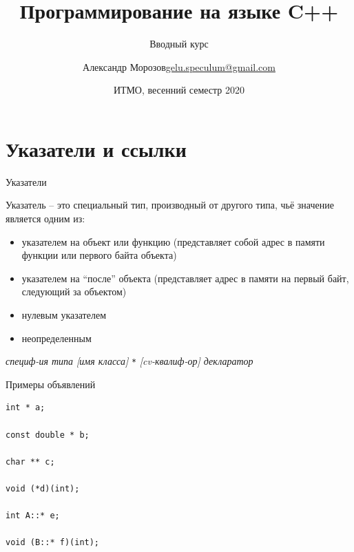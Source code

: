 \documentclass[unknownkeysallowed,xcolor=table]{beamer}
\title[C++]
{Программирование на языке C++}
\subtitle{Вводный курс}
\author[А.~Б.~Морозов]
{
  \texorpdfstring{Александр Морозов\newline\href{mailto:gelu.speculum@gmail.com}{gelu.speculum@gmail.com}}
  {Александр Морозов}
}
\date[ITMO 2020]
{ИТМО, весенний семестр 2020}
\begin{document}
\frame{\titlepage}


\section{Указатели и ссылки}

\begin{frame}[fragile]{Указатели}

Указатель -- это специальный тип, производный от другого типа, чьё значение является одним из:

\vspace{0.7em}

\begin{itemize}
  \item указателем на объект или функцию (представляет собой адрес в памяти функции или первого байта объекта) \vspace{0.5em}
  \item указателем на ``после'' объекта (представляет адрес в памяти на первый байт, следующий за объектом) \vspace{0.5em}
  \item нулевым указателем \vspace{0.5em}
  \item неопределенным
\end{itemize}

\vspace{1.5em}

\emph{специф-ия типа [имя класса]} \lstinline{*} \emph{[cv-квалиф-ор] декларатор} 

\end{frame}

\begin{frame}[fragile]{Примеры объявлений}

\begin{lstlisting}
int * a;

const double * b;

char ** c;

void (*d)(int);

int A::* e;

void (B::* f)(int);
\end{lstlisting}

\end{frame}
\end{document}
